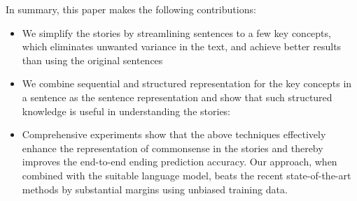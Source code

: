 In summary, this paper makes the following contributions:
\begin{itemize}
\item We simplify the stories by streamlining sentences to a few
key concepts, which eliminates unwanted variance in the text,
and achieve better results than
using the original sentences
\item We combine sequential and structured representation for the key concepts
in a sentence as the sentence representation
and show that such structured
knowledge is useful in understanding the stories:
\item Comprehensive experiments show that the above techniques effectively
enhance the representation of commonsense in the stories and thereby improves
the end-to-end ending prediction accuracy. Our approach, when combined with 
the suitable language model, beats the recent state-of-the-art methods by
substantial margins using unbiased training data.
\end{itemize}
